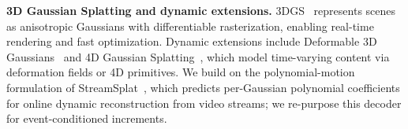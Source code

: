 \noindent\textbf{3D Gaussian Splatting and dynamic extensions.}
3DGS~\cite{kerbl3Dgaussians} represents scenes as anisotropic Gaussians with differentiable rasterization, enabling real-time rendering and fast optimization. Dynamic extensions include Deformable 3D Gaussians~\cite{yang2023deformable3dgs} and 4D Gaussian Splatting~\cite{wu20244dgs}, which model time-varying content via deformation fields or 4D primitives. We build on the polynomial-motion formulation of StreamSplat~\cite{streamsplat2025}, which predicts per-Gaussian polynomial coefficients for online dynamic reconstruction from video streams; we re-purpose this decoder for event-conditioned increments.
